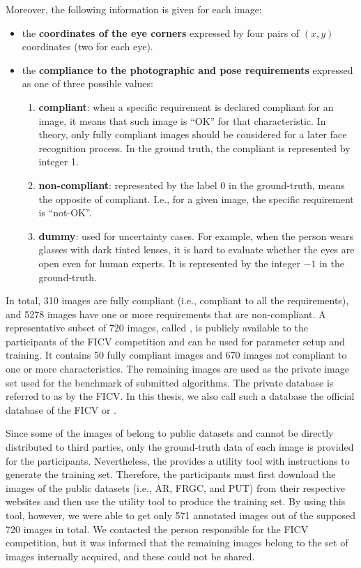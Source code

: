 Moreover, the following information is given for each image:

\begin{itemize}
\item the \textbf{coordinates of the eye corners} expressed by four pairs of $(x, y)$ coordinates (two for each eye).
\item the \textbf{compliance to the photographic and pose requirements} expressed as one of three possible values:     
    \begin{enumerate}[i]
    \item \textbf{compliant}: when a specific requirement is declared compliant for an image, it means that such image is ``OK'' for that characteristic. In theory, only fully compliant images should be considered for a later face recognition process. In the ground truth, the compliant is represented by integer 1.
    \item \textbf{non-compliant}: represented by the label 0 in the ground-truth, means the opposite of compliant. I.e., for a given image, the specific requirement is ``not-OK''.
    \item \textbf{dummy}: used for uncertainty cases. For example, when the person wears glasses with dark tinted lenses, it is hard to evaluate whether the eyes are open even for human experts. It is represented by the integer $-1$ in the ground-truth.
    \end{enumerate}
\end{itemize}

In total, 310 images are fully compliant (i.e., compliant to all the requirements), and 5278 images have one or more requirements that are non-compliant. A representative subset of 720 images, called \ficvtest, is publicly available to the participants of the FICV competition and can be used for parameter setup and training. It contains 50 fully compliant images and 670 images not compliant to one or more characteristics. The remaining images are used as the private image set used for the benchmark of submitted algorithms. The private database is referred to as \ficvofficial by the FICV. In this thesis, we also call such a database the official database of the FICV or \fvcongoing. 

Since some of the images of \ficvtest belong to public datasets and cannot be directly distributed to third parties, only the ground-truth data of each image is provided for the participants. Nevertheless, the \fvcongoing provides a utility tool with instructions to generate the training set. Therefore, the participants must first download the images of the public datasets (i.e., AR, FRGC, and PUT) from their respective websites and then use the utility tool to produce the training set. By using this tool, however, we were able to get only 571 annotated images out of the supposed 720 images in total. We contacted the person responsible for the FICV competition, but it was informed that the remaining images belong to the set of images internally acquired, and these could not be shared.

